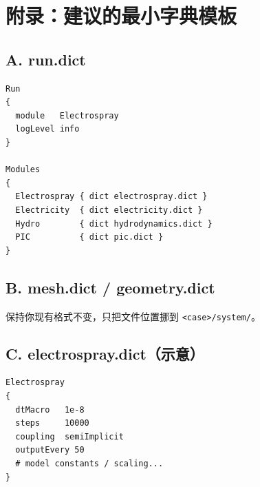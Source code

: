 \documentclass[UTF8,a4paper,11pt]{ctexart}
\begin{document}
\section{附录：建议的最小字典模板}

\subsection*{A. run.dict}
\begin{lstlisting}
Run
{
  module   Electrospray
  logLevel info
}

Modules
{
  Electrospray { dict electrospray.dict }
  Electricity  { dict electricity.dict }
  Hydro        { dict hydrodynamics.dict }
  PIC          { dict pic.dict }
}
\end{lstlisting}

\subsection*{B. mesh.dict / geometry.dict}
保持你现有格式不变，只把文件位置挪到 \texttt{<case>/system/}。

\subsection*{C. electrospray.dict（示意）}
\begin{lstlisting}
Electrospray
{
  dtMacro   1e-8
  steps     10000
  coupling  semiImplicit
  outputEvery 50
  # model constants / scaling...
}
\end{lstlisting}
\end{document}
